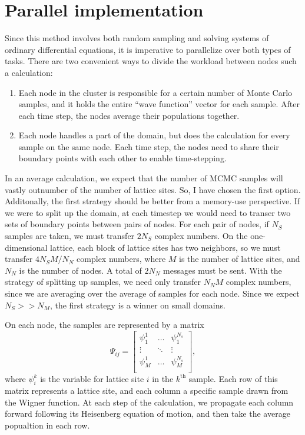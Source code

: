 \documentclass{article}
\begin{document}
\section{Parallel implementation} \label{parallel}

Since this method involves both random sampling and solving systems of ordinary differential equations, it is 
imperative to parallelize over both types of tasks. 
There are two convenient ways to divide the workload between nodes such a calculation:
\begin{enumerate}
    \item Each node in the cluster is responsible for a certain number of Monte Carlo samples, 
    and it holds the entire ``wave function'' vector for each sample. After each time step, 
    the nodes average their populations together. 
    \item Each node handles a part of the domain, but does the calculation for every sample 
    on the same node. Each time step, the nodes need to share their boundary points with 
    each other to enable time-stepping. 
\end{enumerate}
In an average calculation, we expect that the number of MCMC samples will vastly outnumber of the number of lattice sites. 
So, I have chosen the first option. Additonally, the first strategy should be better from a memory-use perspective. 
If we were to split up the domain, at each timestep we would need to transer two sets of boundary points between 
pairs of nodes. For each pair of nodes, if \(N_S\) samples are taken, we must transfer \(2 N_S\) complex numbers. 
On the one-dimensional lattice, each block of lattice sites has two neighbors, so we must transfer  
\(4 N_S M/ N_N\) complex numbers, where \(M\) is the number of lattice sites, and \(N_N\) is the number of nodes.
A total of \(2 N_N\) messages must be sent. With the strategy of splitting up samples, we need only transfer 
\(N_N M\) complex numbers, since we are averaging over the average of samples for each node. Since we expect 
\(N_S >> N_M\), the first strategy is a winner on small domains.

On each node, the samples are represented by a matrix 
\begin{equation}
    \Psi_{ij} = 
    \begin{bmatrix}
        \psi_1^1 & \ldots & \psi_1^{N_s} \\
        \vdots & \ddots & \vdots \\
        \psi_M^1 & \ldots & \psi_M^{N_s} \\
    \end{bmatrix}
    ,
\end{equation}
where \(\psi_i^k\) is the variable for lattice site \(i\) in the \(k^\textrm{th}\) sample. Each row of this matrix 
represents a lattice site, and each column a specific sample drawn from the Wigner function. At each step of the 
calculation, we propagate each column forward following its Heisenberg equation of motion, 
and then take the average popualtion in each row.
\end{document}
